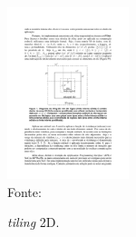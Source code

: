 \begin{figure}[!h]
  \begin{minipage}[b]{0.9\textwidth}
	\centering
    \caption{\textit{tiling} 2D.}
    \includegraphics[height=5cm]{figs/tile.pdf} \\
    Fonte:~\cite{rocha17}
	\label{fig:block2d}
  \end{minipage}
\end{figure}




%


